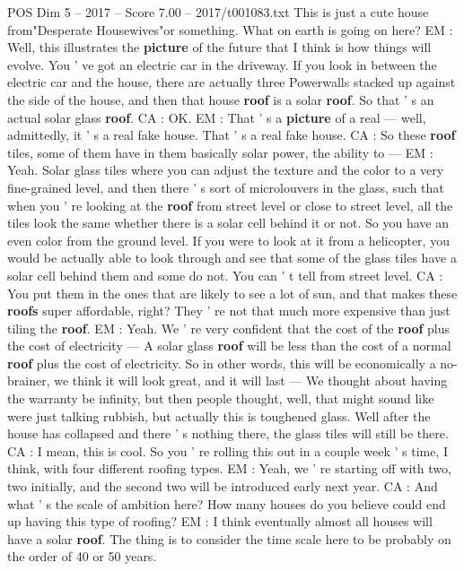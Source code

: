 \begin{textsample}{POS Dim 5 – 2017 – Score 7.00 – 2017/t001083.txt}
This is just a cute house from"Desperate Housewives"or something.
What on earth is going on here?
EM : Well, this illustrates the \textbf{picture} of the future that I think is how things will evolve.
You ' ve got an electric car in the driveway.
If you look in between the electric car and the house, there are actually three Powerwalls stacked up against the side of the house, and then that house \textbf{roof} is a solar \textbf{roof}.
So that ' s an actual solar glass \textbf{roof}.
CA : OK.
EM : That ' s a \textbf{picture} of a real — well, admittedly, it ' s a real fake house.
That ' s a real fake house.
CA : So these \textbf{roof} tiles, some of them have in them basically solar power, the ability to — EM : Yeah.
Solar glass tiles where you can adjust the texture and the color to a very fine-grained level, and then there ' s sort of microlouvers in the glass, such that when you ' re looking at the \textbf{roof} from street level or close to street level, all the tiles look the same whether there is a solar cell behind it or not.
So you have an even color from the ground level.
If you were to look at it from a helicopter, you would be actually able to look through and see that some of the glass tiles have a solar cell behind them and some do not.
You can ' t tell from street level.
CA : You put them in the ones that are likely to see a lot of sun, and that makes these \textbf{roofs} super affordable, right?
They ' re not that much more expensive than just tiling the \textbf{roof}.
EM : Yeah.
We ' re very confident that the cost of the \textbf{roof} plus the cost of electricity — A solar glass \textbf{roof} will be less than the cost of a normal \textbf{roof} plus the cost of electricity.
So in other words, this will be economically a no-brainer, we think it will look great, and it will last — We thought about having the warranty be infinity, but then people thought, well, that might sound like were just talking rubbish, but actually this is toughened glass.
Well after the house has collapsed and there ' s nothing there, the glass tiles will still be there.
CA : I mean, this is cool.
So you ' re rolling this out in a couple week ' s time, I think, with four different roofing types.
EM : Yeah, we ' re starting off with two, two initially, and the second two will be introduced early next year.
CA : And what ' s the scale of ambition here?
How many houses do you believe could end up having this type of roofing?
EM : I think eventually almost all houses will have a solar \textbf{roof}.
The thing is to consider the time scale here to be probably on the order of 40 or 50 years.

\end{textsample}
